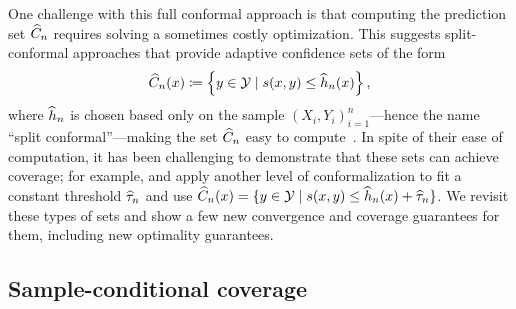 \documentclass[11pt]{article}
\newcommand{\scorefunc}{s}
\begin{document}
One challenge with this full conformal approach is that computing
the prediction set $\widehat{C}_n$ requires solving a sometimes costly
optimization.
%
This suggests split-conformal approaches that provide adaptive
confidence sets of the form
\begin{equation*}
  \what{C}_n(x) \defeq \left\{y \in \mc{Y} \mid \scorefunc(x, y)
  \le \what{h}_n(x)\right\},
\end{equation*}
where $\widehat{h}_n$ is chosen based only on the sample $(X_i, Y_i)_{i =
  1}^n$---hence the name ``split conformal''---making the set $\widehat{C}_n$
easy to compute~\cite{RomanoPaCa19, CauchoisGuDu21}.
%
In spite of their ease of computation, it has been challenging to
demonstrate that these sets can achieve coverage;
for example, \citet{RomanoPaCa19} and \citet{CauchoisGuDu21}
apply another level of conformalization to
fit a constant threshold $\widehat{\tau}_n$ and use
$\what{C}_n(x) = \{y \in \mc{Y} \mid \scorefunc(x, y) \le
\what{h}_n(x) + \what{\tau}_n\}$.
%
%
We revisit these types of sets and show a few new convergence
and coverage guarantees for them, including new optimality guarantees.

\subsection{Sample-conditional coverage}
\label{sec:intro-sample-conditional}
\end{document}
